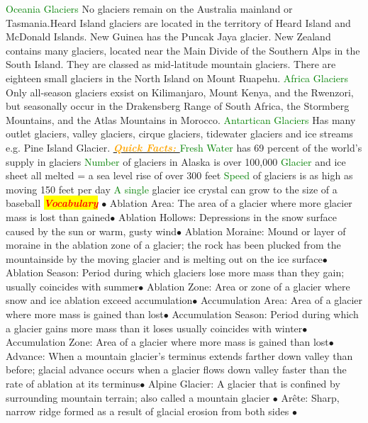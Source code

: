 \documentclass{article}
\newcommand{\ddd}{$\bullet$}
\newcommand{\red}[1]{\textcolor{red}{#1}}
\newcommand{\green}[1]{\textcolor{green}{#1}}
\newcommand{\orange}[1]{\textcolor{orange}{#1}}
\newcommand{\mysection}[1]{\colorbox{yellow}{\textbf{\textit{\red{#1}}}}}
\newcommand{\mysub}[1]{\underline{\textbf{{\textit{\orange{#1}}}}}}
\newcommand{\mysubsub}[1]{{{\green{#1}}}}
\begin{document}
\begin{multicols*}{4}
		    \mysubsub{Oceania Glaciers} No glaciers remain on the Australia mainland or Tasmania.Heard Island glaciers are located in the territory of Heard Island and McDonald Islands. New Guinea has the Puncak Jaya glacier. New Zealand contains many glaciers,  located near the Main Divide of the Southern Alps in the South Island. They are classed as mid-latitude mountain glaciers. There are eighteen small glaciers in the North Island on Mount Ruapehu.
		    \mysubsub{Africa Glaciers} Only all-season glaciers exsist on Kilimanjaro, Mount Kenya, and the Rwenzori, but seasonally occur in the Drakensberg Range of South Africa, the Stormberg Mountains, and the Atlas Mountains in Morocco.
		    \mysubsub{Antartican Glaciers} Has many outlet glaciers, valley glaciers, cirque glaciers, tidewater glaciers and ice streams e.g. Pine Island Glacier. 
		    \mysub{Quick Facts: }
		    \mysubsub{Fresh Water} has 69 percent of the world's supply in glaciers
		    \mysubsub{Number} of glaciers in Alaska is over 100,000
		    \mysubsub{Glacier} and ice sheet all melted = a sea level rise of over 300 feet
		    \mysubsub{Speed} of glaciers is as high as moving 150 feet per day
		    \mysubsub{A single} glacier ice crystal can grow to the size of a baseball
	\mysection{Vocabulary} 
		\ddd
        Ablation Area: The area of a glacier where more glacier mass is lost than gained\ddd
        Ablation Hollows: Depressions in the snow surface caused by the sun or warm, gusty wind\ddd
        Ablation Moraine: Mound or layer of moraine in the ablation zone of a glacier; the rock has been plucked from the mountainside by the moving glacier and is melting out on the ice surface\ddd
        Ablation Season: Period during which glaciers lose more mass than they gain; usually coincides with summer\ddd
        Ablation Zone: Area or zone of a glacier where snow and ice ablation exceed accumulation\ddd
        Accumulation Area: Area of a glacier where more mass is gained than lost\ddd
        Accumulation Season: Period during which a glacier gains more mass than it loses usually coincides with winter\ddd
        Accumulation Zone: Area of a glacier where more mass is gained than lost\ddd
        Advance: When a mountain glacier’s terminus extends farther down valley than before; glacial advance occurs when a glacier flows down valley faster than the rate of ablation at its terminus\ddd
        Alpine Glacier: A glacier that is confined by surrounding mountain terrain; also called a mountain glacier \ddd
        Arête: Sharp, narrow ridge formed as a result of glacial erosion from both sides \ddd 

\end{multicols*}
\end{document}
